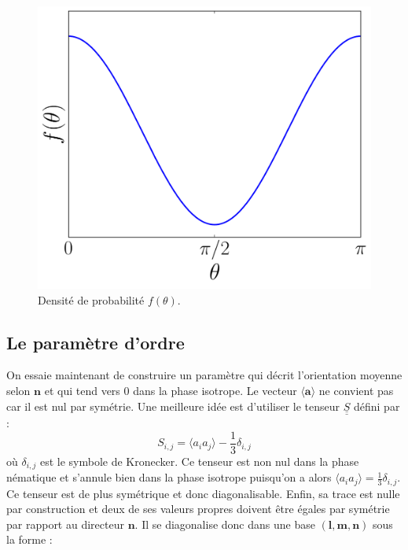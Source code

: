 \documentclass[11pt,a4paper]{article}
\numberwithin{equation}{section}
\begin{document}
\begin{figure}[h]
    \centering	    
	\includegraphics[scale=0.4]{figures/distrib.pdf}
    \caption{Densité de probabilité $f(\theta)$.}
    	\label{distrib} 
\end{figure}

\subsection{Le paramètre d'ordre}
On essaie maintenant de construire un paramètre qui décrit l'orientation moyenne selon $\bm{n}$ et qui tend vers 0 dans la phase isotrope. Le vecteur $\langle \bm{a} \rangle $ ne convient pas car il est nul par symétrie. Une meilleure idée est d'utiliser le tenseur $\underline{\underline{S}}$ défini par :
\begin{equation}
S_{i,j} = \langle a_i a_j \rangle -\frac{1}{3} \delta_{i,j}
\label{tenseur}
\end{equation}
où $\delta_{i,j}$ est le symbole de Kronecker. Ce tenseur est non nul dans la phase nématique et s'annule bien dans la phase isotrope puisqu'on a alors $\langle  a_i a_j \rangle  = \frac{1}{3} \delta_{i,j}$. Ce tenseur est de plus symétrique et donc diagonalisable. Enfin, sa trace est nulle par construction et deux de ses valeurs propres doivent être égales par symétrie par rapport au directeur $\bm{n}$. Il se diagonalise donc dans une base $(\bm{l}, \bm{m}, \bm{n})$ sous la forme :
\end{document}
